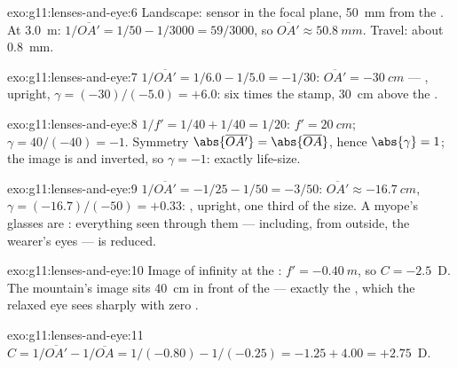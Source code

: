 \begin{solution}{exo:g11:lenses-and-eye:6}
Landscape: sensor in the focal plane, \qty{50}{mm} from the . At
\qty{3.0}{m}: $1/\overline{OA'} = 1/50 - 1/3000 = 59/3000$, so
$\overline{OA'} \approx \qty{50.8}{mm}$. Travel: about \qty{0.8}{mm}.
\end{solution}

\begin{solution}{exo:g11:lenses-and-eye:7}
$1/\overline{OA'} = 1/6.0 - 1/5.0 = -1/30$:
$\overline{OA'} = \qty{-30}{cm}$ --- , upright,
$\gamma = (-30)/(-5.0) = +6.0$: six times the stamp, \qty{30}{cm}
above the .
\end{solution}

\begin{solution}{exo:g11:lenses-and-eye:8}
$1/f' = 1/40 + 1/40 = 1/20$: $f' = \qty{20}{cm}$;
$\gamma = 40/(-40) = -1$. Symmetry 
$\abs{\overline{OA'}} = \abs{\overline{OA}}$, hence
$\abs{\gamma} = 1$; the image is  and inverted, so $\gamma = -1$:
exactly life-size.
\end{solution}

\begin{solution}{exo:g11:lenses-and-eye:9}
$1/\overline{OA'} = -1/25 - 1/50 = -3/50$:
$\overline{OA'} \approx \qty{-16.7}{cm}$,
$\gamma = (-16.7)/(-50) = +0.33$: , upright, one third of the
size. A myope's glasses are : everything seen through them
--- including, from outside, the wearer's eyes --- is reduced.
\end{solution}

\begin{solution}{exo:g11:lenses-and-eye:10}
Image of infinity at the : $f' = \qty{-0.40}{m}$, so
$C = -2.5$~D. The mountain's image sits \qty{40}{cm} in front of the
 --- exactly the , which the relaxed eye sees sharply
with zero .
\end{solution}

\begin{solution}{exo:g11:lenses-and-eye:11}
$C = 1/\overline{OA'} - 1/\overline{OA} = 1/(-0.80) - 1/(-0.25)
= -1.25 + 4.00 = +2.75$~D.
\end{solution}


